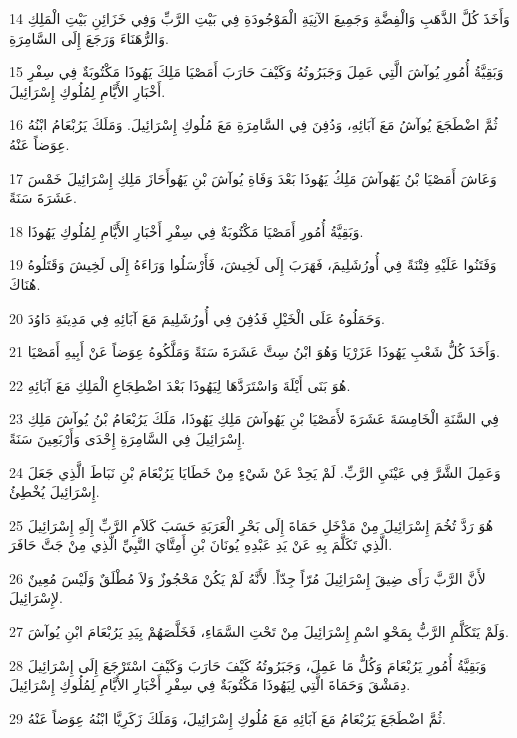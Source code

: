 \par 14 وَأَخَذَ كُلَّ الذَّهَبِ وَالْفِضَّةِ وَجَمِيعَ الآنِيَةِ الْمَوْجُودَةِ فِي بَيْتِ الرَّبِّ وَفِي خَزَائِنِ بَيْتِ الْمَلِكِ وَالرُّهَنَاءَ وَرَجَعَ إِلَى السَّامِرَةِ.
\par 15 وَبَقِيَّةُ أُمُورِ يُوآشَ الَّتِي عَمِلَ وَجَبَرُوتُهُ وَكَيْفَ حَارَبَ أَمَصْيَا مَلِكَ يَهُوذَا مَكْتُوبَةٌ فِي سِفْرِ أَخْبَارِ الأَيَّامِ لِمُلُوكِ إِسْرَائِيلَ.
\par 16 ثُمَّ اضْطَجَعَ يُوآشُ مَعَ آبَائِهِ، وَدُفِنَ فِي السَّامِرَةِ مَعَ مُلُوكِ إِسْرَائِيلَ. وَمَلَكَ يَرُبْعَامُ ابْنُهُ عِوَضاً عَنْهُ.
\par 17 وَعَاشَ أَمَصْيَا بْنُ يَهُوآشَ مَلِكُ يَهُوذَا بَعْدَ وَفَاةِ يُوآشَ بْنِ يَهُوأَحَازَ مَلِكِ إِسْرَائِيلَ خَمْسَ عَشَرَةَ سَنَةً.
\par 18 وَبَقِيَّةُ أُمُورِ أَمَصْيَا مَكْتُوبَةٌ فِي سِفْرِ أَخْبَارِ الأَيَّامِ لِمُلُوكِ يَهُوذَا.
\par 19 وَفَتَنُوا عَلَيْهِ فِتْنَةً فِي أُورُشَلِيمَ، فَهَرَبَ إِلَى لَخِيشَ، فَأَرْسَلُوا وَرَاءَهُ إِلَى لَخِيشَ وَقَتَلُوهُ هُنَاكَ.
\par 20 وَحَمَلُوهُ عَلَى الْخَيْلِ فَدُفِنَ فِي أُورُشَلِيمَ مَعَ آبَائِهِ فِي مَدِينَةِ دَاوُدَ.
\par 21 وَأَخَذَ كُلُّ شَعْبِ يَهُوذَا عَزَرْيَا وَهُوَ ابْنُ سِتَّ عَشَرَةَ سَنَةً وَمَلَّكُوهُ عِوَضاً عَنْ أَبِيهِ أَمَصْيَا.
\par 22 هُوَ بَنَى أَيْلَةَ وَاسْتَرَدَّهَا لِيَهُوذَا بَعْدَ اضْطِجَاعِ الْمَلِكِ مَعَ آبَائِهِ.
\par 23 فِي السَّنَةِ الْخَامِسَةَ عَشَرَةَ لأَمَصْيَا بْنِ يَهُوآشَ مَلِكِ يَهُوذَا، مَلَكَ يَرُبْعَامُ بْنُ يُوآشَ مَلِكِ إِسْرَائِيلَ فِي السَّامِرَةِ إِحْدَى وَأَرْبَعِينَ سَنَةً.
\par 24 وَعَمِلَ الشَّرَّ فِي عَيْنَيِ الرَّبِّ. لَمْ يَحِدْ عَنْ شَيْءٍ مِنْ خَطَايَا يَرُبْعَامَ بْنِ نَبَاطَ الَّذِي جَعَلَ إِسْرَائِيلَ يُخْطِئُ.
\par 25 هُوَ رَدَّ تُخُمَ إِسْرَائِيلَ مِنْ مَدْخَلِ حَمَاةَ إِلَى بَحْرِ الْعَرَبَةِ حَسَبَ كَلاَمِ الرَّبِّ إِلَهِ إِسْرَائِيلَ الَّذِي تَكَلَّمَ بِهِ عَنْ يَدِ عَبْدِهِ يُونَانَ بْنِ أَمِتَّايَ النَّبِيِّ الَّذِي مِنْ جَتَّ حَافَرَ.
\par 26 لأَنَّ الرَّبَّ رَأَى ضِيقَ إِسْرَائِيلَ مُرّاً جِدّاً. لأَنَّهُ لَمْ يَكُنْ مَحْجُوزٌ وَلاَ مُطْلَقٌ وَلَيْسَ مُعِينٌ لإِسْرَائِيلَ.
\par 27 وَلَمْ يَتَكَلَّمِ الرَّبُّ بِمَحْوِ اسْمِ إِسْرَائِيلَ مِنْ تَحْتِ السَّمَاءِ، فَخَلَّصَهُمْ بِيَدِ يَرُبْعَامَ ابْنِ يُوآشَ.
\par 28 وَبَقِيَّةُ أُمُورِ يَرُبْعَامَ وَكُلُّ مَا عَمِلَ، وَجَبَرُوتُهُ كَيْفَ حَارَبَ وَكَيْفَ اسْتَرْجَعَ إِلَى إِسْرَائِيلَ دِمَشْقَ وَحَمَاةَ الَّتِي لِيَهُوذَا مَكْتُوبَةٌ فِي سِفْرِ أَخْبَارِ الأَيَّامِ لِمُلُوكِ إِسْرَائِيلَ.
\par 29 ثُمَّ اضْطَجَعَ يَرُبْعَامُ مَعَ آبَائِهِ مَعَ مُلُوكِ إِسْرَائِيلَ، وَمَلَكَ زَكَرِيَّا ابْنُهُ عِوَضاً عَنْهُ.


